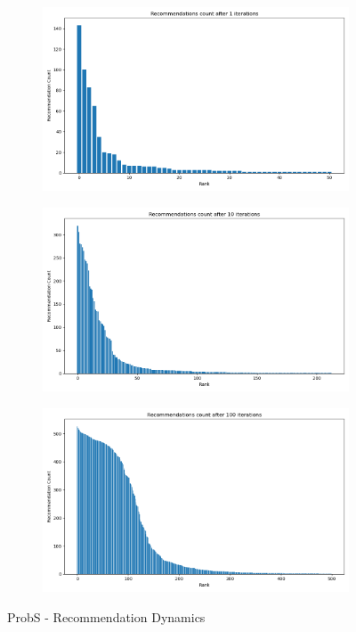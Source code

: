 \documentclass[12pt]{article}
\numberwithin{equation}{section}
\begin{document}
\begin{figure}[!ht]
\begin{subfigure}[b]{0.32\textwidth}
    \includegraphics[width=\textwidth]{Prob S movie recommendations - 1 iterations.png}
\end{subfigure}
\hfill
\begin{subfigure}[b]{0.32\textwidth}
    \includegraphics[width=\textwidth]{Prob S movie recommendations - 10 iterations.png}
\end{subfigure}
\hfill
\begin{subfigure}[b]{0.32\textwidth}
    \includegraphics[width=\textwidth]{Prob S movie recommendations - 100 iterations.png}
\end{subfigure}

\caption{ProbS - Recommendation Dynamics}
\label{fig:temporal prob S}

\end{figure}
\end{document}
